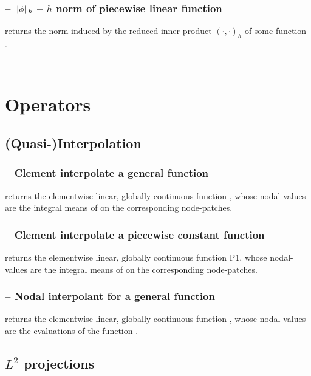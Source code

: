 \documentclass[twoside,11pt,a4paper]{article} %
\begin{document}
\subsubsection*{\texorpdfstring{ -- $\lVert\phi\rVert_{h}$ --}{} \texorpdfstring{$h$}{h} norm of piecewise linear function}
 returns the norm induced by the reduced inner product $(\cdot, \cdot)_h$ of some function .
\begin{verbatim}


\end{verbatim}

\section{Operators}
\subsection{(Quasi-)Interpolation}
\subsubsection*{\texorpdfstring{ --}{} Clement interpolate a general function}
 returns the elementwise linear, globally continuous function , whose nodal-values are the integral means of  on the corresponding node-patches.
\subsubsection*{\texorpdfstring{ --}{} Clement interpolate a piecewise constant function}
 returns the elementwise linear, globally continuous function P1, whose nodal-values are the integral means of  on the corresponding node-patches.
\subsubsection*{\texorpdfstring{ --}{} Nodal interpolant for a general function}
 returns the elementwise linear, globally continuous function , whose nodal-values are the evaluations of the function .
\subsection{\texorpdfstring{$L^2$}{L2} projections}
\end{document}
